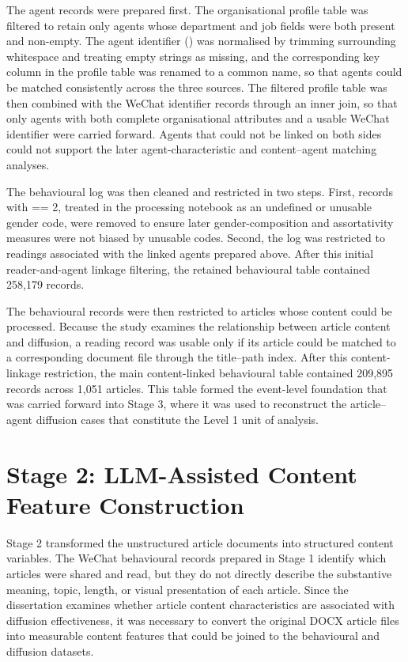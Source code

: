 The agent records were prepared first. The organisational profile table was filtered to retain only agents whose department and job fields were both present and non-empty. The agent identifier () was normalised by trimming surrounding whitespace and treating empty strings as missing, and the corresponding key column in the profile table was renamed to a common name, so that agents could be matched consistently across the three sources. The filtered profile table was then combined with the WeChat identifier records through an inner join, so that only agents with both complete organisational attributes and a usable WeChat identifier were carried forward. Agents that could not be linked on both sides could not support the later agent-characteristic and content–agent matching analyses.

The behavioural log was then cleaned and restricted in two steps. First, records with  == 2, treated in the processing notebook as an undefined or unusable gender code, were removed to ensure later gender-composition and assortativity measures were not biased by unusable codes. Second, the log was restricted to readings associated with the linked agents prepared above. After this initial reader-and-agent linkage filtering, the retained behavioural table contained 258,179 records.

The behavioural records were then restricted to articles whose content could be processed. Because the study examines the relationship between article content and diffusion, a reading record was usable only if its article could be matched to a corresponding document file through the title–path index. After this content-linkage restriction, the main content-linked behavioural table contained 209,895 records across 1,051 articles. This table formed the event-level foundation that was carried forward into Stage 3, where it was used to reconstruct the article–agent diffusion cases that constitute the Level 1 unit of analysis.

\section{Stage 2: LLM-Assisted Content Feature Construction}
\label{sec:4-3-stage-2-llm-assisted-content-feature-construction}

Stage 2 transformed the unstructured article documents into structured content variables. The WeChat behavioural records prepared in Stage 1 identify which articles were shared and read, but they do not directly describe the substantive meaning, topic, length, or visual presentation of each article. Since the dissertation examines whether article content characteristics are associated with diffusion effectiveness, it was necessary to convert the original DOCX article files into measurable content features that could be joined to the behavioural and diffusion datasets.

